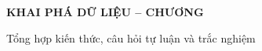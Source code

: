 
\begin{center}
    {\fontsize{14pt}{14pt}\selectfont
        \textbf{KHAI PHÁ DỮ LIỆU -- CHƯƠNG \ChapterNum}\par}
    \vspace{4pt}
    {\fontsize{13pt}{13pt}\selectfont
        \textbf{\ChapterTitle}\par}
    \vspace{6pt}
    {\fontsize{10pt}{10pt}\selectfont
        Tổng hợp kiến thức, câu hỏi tự luận và trắc nghiệm\par}
\end{center}

